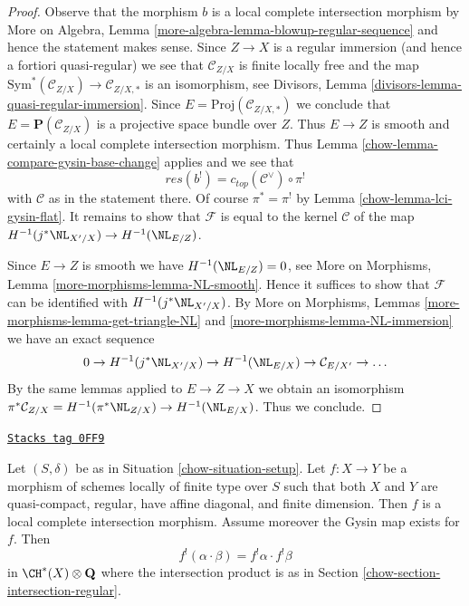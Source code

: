 \begin{proof}

Observe that the morphism $b$ is a local complete intersection morphism
by More on Algebra, Lemma \ref{more-algebra-lemma-blowup-regular-sequence}
and hence the statement makes sense. Since $Z \to X$ is a regular
immersion (and hence a fortiori quasi-regular) we see that $\mathcal{C}_{Z/X}$
is finite locally free and the map
$\text{Sym}^*(\mathcal{C}_{Z/X}) \to \mathcal{C}_{Z/X, *}$
is an isomorphism, see
Divisors, Lemma \ref{divisors-lemma-quasi-regular-immersion}.
Since $E = \text{Proj}(\mathcal{C}_{Z/X, *})$ we conclude
that $E = \mathbf{P}(\mathcal{C}_{Z/X})$
is a projective space bundle over $Z$.
Thus $E \to Z$ is smooth and certainly a local complete intersection
morphism. Thus Lemma \ref{chow-lemma-compare-gysin-base-change}
applies and we see that
$$
res(b^!) = c_{top}(\mathcal{C}^\vee) \circ \pi^!
$$
with $\mathcal{C}$ as in the statement there.
Of course $\pi^* = \pi^!$ by Lemma \ref{chow-lemma-lci-gysin-flat}.
It remains to show that $\mathcal{F}$ is equal to
the kernel $\mathcal{C}$ of the map
$H^{-1}(j^*\NL_{X'/X}) \to H^{-1}(\NL_{E/Z})$.

\medskip\noindent
Since $E \to Z$ is smooth we have $H^{-1}(\NL_{E/Z}) = 0$, see
More on Morphisms, Lemma \ref{more-morphisms-lemma-NL-smooth}.
Hence it suffices to show that $\mathcal{F}$ can be identified
with $H^{-1}(j^*\NL_{X'/X})$. By More on Morphisms, Lemmas
\ref{more-morphisms-lemma-get-triangle-NL} and
\ref{more-morphisms-lemma-NL-immersion} we have an exact sequence
$$
0 \to H^{-1}(j^*\NL_{X'/X}) \to H^{-1}(\NL_{E/X}) \to
\mathcal{C}_{E/X'} \to \ldots
$$
By the same lemmas applied to $E \to Z \to X$ we obtain an isomorphism
$\pi^*\mathcal{C}_{Z/X} = H^{-1}(\pi^*\NL_{Z/X}) \to H^{-1}(\NL_{E/X})$.
Thus we conclude.
\end{proof}

\begin{lemma}
\label{chow-lemma-lci-gysin-product-regular}
\href{https://stacks.math.columbia.edu/tag/0FF9}{\texttt{Stacks tag 0FF9}}

Let $(S, \delta)$ be as in Situation \ref{chow-situation-setup}.
Let $f : X \to Y$ be a morphism of schemes locally of finite
type over $S$ such that both $X$ and $Y$ are quasi-compact,
regular, have affine diagonal, and finite dimension.
Then $f$ is a local complete intersection morphism.
Assume moreover the Gysin map exists for $f$. Then
$$
f^!(\alpha \cdot \beta) = f^!\alpha \cdot f^!\beta
$$
in $\CH^*(X) \otimes \mathbf{Q}$ where the intersection product
is as in Section \ref{chow-section-intersection-regular}.
\end{lemma}

